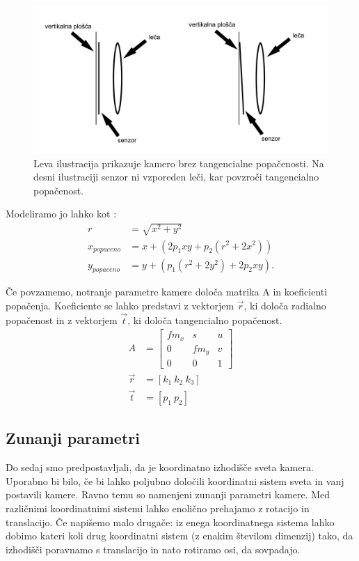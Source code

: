 \documentclass[a4paper, 12pt]{book}
\begin{document}
\begin{figure}[H]
\centering
\includegraphics[width=\textwidth,height=\textheight,keepaspectratio]{tangential.png}
\caption{Leva ilustracija prikazuje kamero brez tangencialne popačenosti. Na desni ilustraciji senzor ni vzporeden leči, kar povzroči tangencialno popačenost.}
\end{figure}

Modeliramo jo lahko kot \cite{brown1966decentering}:
\begin{align}
r &= \sqrt{x^2 + y^2} \\ 
x_{popaceno} &= x + (2p_1xy + p_2(r^2 + 2x^2)) \\
y_{popaceno} &= y + (p_1(r^2 + 2y^2) + 2p_2xy). \label{tangentialdisteq}
\end{align}

Če povzamemo, notranje parametre kamere določa matrika A in koeficienti popačenja. Koeficiente se lahko predstavi z vektorjem $\vec{r}$, ki določa radialno popačenost in z vektorjem $\vec{t}$, ki določa tangencialno popačenost.
\begin{align*}
A &= 
\begin{bmatrix}
fm_x & s & u \\
0 & fm_y & v \\
0 & 0 & 1
\end{bmatrix} \\
\vec{r} &= [k_1 \ k_2 \ k_3] \\
\vec{t} &= [p_1 \ p_2]
\end{align*}

\subsection{Zunanji parametri}
Do sedaj smo predpostavljali, da je koordinatno izhodišče sveta kamera. Uporabno bi bilo, če bi lahko poljubno določili koordinatni sistem sveta in vanj postavili kamere. Ravno temu so namenjeni zunanji parametri kamere. Med različnimi koordinatnimi sistemi lahko enolično prehajamo z rotacijo in translacijo. Če napišemo malo drugače: iz enega koordinatnega sistema lahko dobimo kateri koli drug koordinatni sistem (z enakim številom dimenzij) tako, da izhodišči poravnamo s translacijo in nato rotiramo osi, da sovpadajo. 
\end{document}
